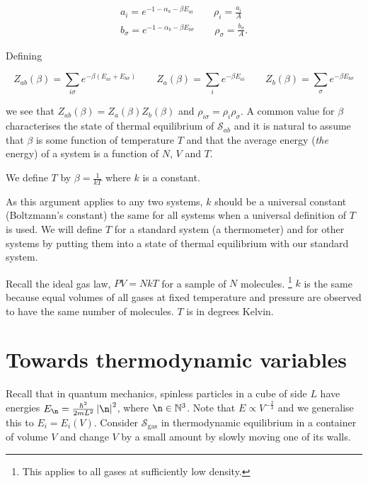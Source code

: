 \documentclass{notes}
\newcommand{\cS}{\mathcal{S}}
\begin{document}
\begin{gather*}
a_i = e^{-1 - \alpha_a - \beta E_{a i}} \qquad \rho_i = \frac{a_i}{A} \\
b_\sigma = e^{-1 - \alpha_b - \beta E_{b \sigma}} \qquad \rho_\sigma =
\frac{b_\sigma}{A}.
\end{gather*} 

Defining

\[
Z_{a b}(\beta) = \sum_{i \sigma} e^{-\beta \left( E_{a i}
+ E_{b \sigma} \right)} \qquad
Z_a(\beta) = \sum_i e^{-\beta E_{a i}} \qquad
Z_b(\beta) = \sum_\sigma e^{-\beta E_{b \sigma}}
\]

we see that $Z_{a b}(\beta) = Z_a(\beta) Z_b(\beta)$ and
$\rho_{i \sigma} = \rho_i \rho_\sigma$.  A common value for $\beta$
characterises the state of thermal equilibrium of $\cS_{ab}$ and
it is natural to assume that $\beta$ is some function of temperature
$T$ and that the average energy (\emph{the} energy) of a system
is a function of $N$, $V$ and $T$.

We define $T$ by $\beta = \frac{1}{k T}$ where $k$ is a constant.

As this argument applies to any two systems, $k$ should be a universal
constant (Boltzmann's constant) the same for all systems when
a universal definition of $T$ is used.  We will define $T$ for a standard
system (a thermometer) and for other systems by putting them into
a state of thermal equilibrium with our standard system.

Recall the ideal gas law, $PV = N k T$ for a sample of $N$ molecules.%
\footnote{This applies to all gases at sufficiently low density.}
$k$ is the same because equal volumes of all gases at fixed temperature
and pressure are observed to have the same number of molecules.
$T$ is in degrees Kelvin.

\section{Towards thermodynamic variables}

Recall that in quantum mechanics, spinless particles in a cube
of side $L$ have energies $E_\n = \frac{\hbar^2}{2 m L^2}
\abs{\n}^2$, where $\n \in \mathbb{N}^3$.  Note
that $E \propto V^{-\frac{2}{3}}$ and we generalise this to
$E_i = E_i(V)$.  Consider $\cS_{\text{gas}}$ in thermodynamic
equilibrium in a container of volume $V$ and change $V$ by a small
amount by slowly moving one of its walls.

\vspace{1in}
\end{document}
